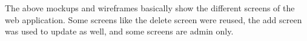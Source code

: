 The above mockups and wireframes basically show the different screens of the web application. Some screens like the delete screen were reused, the add screen was used to update as well, and some screens are admin only. 
